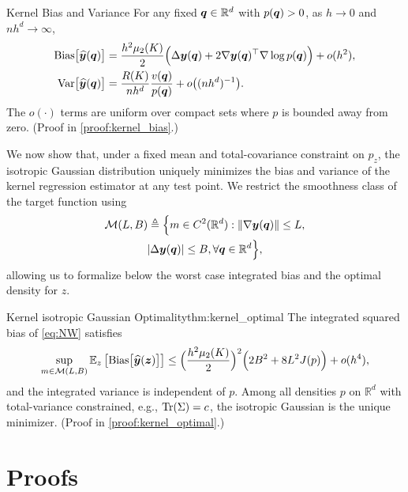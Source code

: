 \begin{lemma}[label={thm:kernel_bias}]{Kernel Bias and Variance}{}
For any fixed ${\bm{q}}\in\mathbb{R}^d$ with $p({\bm{q}})>0$, as $h\to 0$ and $n h^d\to\infty$,
\begin{align*}
\mathrm{Bias}\big[\widehat {{\bm{y}}}({\bm{q}})\big]
&=\frac{h^2\mu_2(K)}{2}\Big(\Delta {\bm{y}}({\bm{q}})+2\nabla {\bm{y}}({\bm{q}})^\top \nabla\log p({\bm{q}})\Big)+o(h^2),\\
\mathrm{Var}\big[\widehat {{\bm{y}}}({\bm{q}})\big]
&=\frac{R(K)}{n h^d}\frac{v({\bm{q}})}{p({\bm{q}})}+o\big((n h^d)^{-1}\big).
\end{align*}
The $o(\cdot)$ terms are uniform over compact sets where $p$ is bounded away from zero.
(Proof in \cref{proof:kernel_bias}.)
\end{lemma}



We now show that, under a fixed mean and total-covariance constraint on $p_z$, the isotropic Gaussian distribution uniquely minimizes the bias and variance of the kernel regression estimator at any test point. We restrict the smoothness class of the target function using 
\begin{multline*}
    \mathcal{M}(L,B)\triangleq\Big\{m\in C^2(\mathbb{R}^d):\|\nabla {\bm{y}}({\bm{q}})\|\le L,\\|\Delta {\bm{y}}({\bm{q}})|\le B, \forall  {\bm{q}}\in\mathbb{R}^d\Big\},
\end{multline*}
allowing us to formalize below the worst case integrated bias and the optimal density for $z$.



\begin{theorem}[label={thm:kernel_optimal}]{Kernel isotropic Gaussian Optimality}{thm:kernel_optimal}
The integrated squared bias of \eqref{eq:NW} satisfies
\begin{multline*}
\sup_{m\in\mathcal{M}(L,B)}\mathbb{E}_{z}\left[\mathrm{Bias}\big[\widehat {{\bm{y}}}({\bm{z}})\big]\right]
\le \Big(\frac{h^2\mu_2(K)}{2}\Big)^2 \Big(2 B^2 + 8 L^2J(p)\Big)+o(h^4),
\end{multline*}
and the integrated variance is independent of $p$. 
Among all densities $p$ on $\mathbb{R}^d$ with total-variance constrained, e.g., $\operatorname{Tr}(\Sigma)=c$, the isotropic Gaussian is the unique minimizer. (Proof in \cref{proof:kernel_optimal}.)
\end{theorem}



\section{Proofs}





